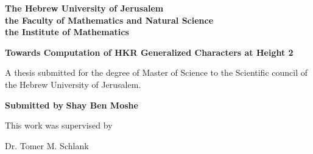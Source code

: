 \begin{titlepage}
	\begin{center}
		
		\Large
		\textbf{The Hebrew University of Jerusalem}\\
		\textbf{the Faculty of Mathematics and Natural Science}\\
		\textbf{the Institute of Mathematics}
		
		\vfill
		
		\textbf{Towards Computation of HKR Generalized Characters at Height 2}
		\vfill
		
		A thesis submitted for the degree of Master of Science to the Scientific council of the Hebrew University of Jerusalem.
		
		\vfill
		
		\textbf{Submitted by}
		\textbf{Shay Ben Moshe}
		\vfill
		
		\vfill
		This work was supervised by
		
		Dr. Tomer M. Schlank
	\end{center}
\end{titlepage}